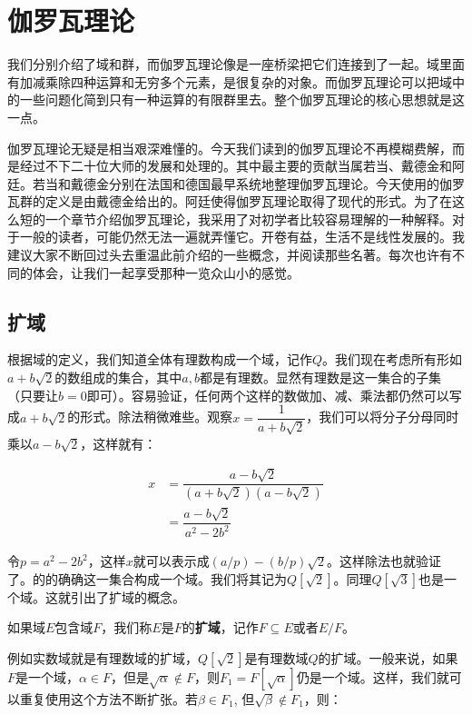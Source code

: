 \documentclass[b5paper]{ctexart}
\begin{document}
\section{伽罗瓦理论}
我们分别介绍了域和群，而伽罗瓦理论像是一座桥梁把它们连接到了一起。域里面有加减乘除四种运算和无穷多个元素，是很复杂的对象。而伽罗瓦理论可以把域中的一些问题化简到只有一种运算的有限群里去。整个伽罗瓦理论的核心思想就是这一点。

伽罗瓦理论无疑是相当艰深难懂的。今天我们读到的伽罗瓦理论不再模糊费解，而是经过不下二十位大师的发展和处理的。其中最主要的贡献当属若当、戴德金和阿廷。若当和戴德金分别在法国和德国最早系统地整理伽罗瓦理论。今天使用的伽罗瓦群的定义是由戴德金给出的。阿廷使得伽罗瓦理论取得了现代的形式\cite{ZhangPu2013}。为了在这么短的一个章节介绍伽罗瓦理论，我采用了对初学者比较容易理解的一种解释\cite{Stillwell1994}。对于一般的读者，可能仍然无法一遍就弄懂它。开卷有益，生活不是线性发展的。我建议大家不断回过头去重温此前介绍的一些概念，并阅读那些名著。每次也许有不同的体会，让我们一起享受那种一览众山小的感觉。

\subsection{扩域}
根据域的定义，我们知道全体有理数构成一个域，记作$Q$。我们现在考虑所有形如$a + b\sqrt{2}$的数组成的集合，其中$a, b$都是有理数\cite{Goodman2011}。显然有理数是这一集合的子集（只要让$b=0$即可）。容易验证，任何两个这样的数做加、减、乘法都仍然可以写成$a + b \sqrt{2}$的形式。除法稍微难些。观察$x = \dfrac{1}{a + b\sqrt{2}}$，我们可以将分子分母同时乘以$a - b \sqrt{2}$，这样就有：

\[
\begin{array}{rl}
x & = \dfrac{a - b \sqrt{2}}{(a + b \sqrt{2})(a - b \sqrt{2})} \\[2ex]
  & = \dfrac{a - b \sqrt{2}}{a^2 - 2b^2}
\end{array}
\]

令$p = a^2 - 2b^2$，这样$x$就可以表示成$(a/p) -(b/p)\sqrt{2}$。这样除法也就验证了。的的确确这一集合构成一个域。我们将其记为$Q[\sqrt{2}]$。同理$Q[\sqrt{3}]$也是一个域。这就引出了扩域的概念。

\begin{definition}
如果域$E$包含域$F$，我们称$E$是$F$的\textbf{扩域}，记作$F \subseteq E$或者$E/F$。
\end{definition}

例如实数域就是有理数域的扩域，$Q[\sqrt{2}]$是有理数域$Q$的扩域。一般来说，如果$F$是一个域，$\alpha \in F$，但是$\sqrt{\alpha} \not\in F$，则$F_1 = F[\sqrt{\alpha}]$仍是一个域。这样，我们就可以重复使用这个方法不断扩张。若$\beta \in F_1$, 但$\sqrt{\beta} \not\in F_1$，则：
\end{document}
